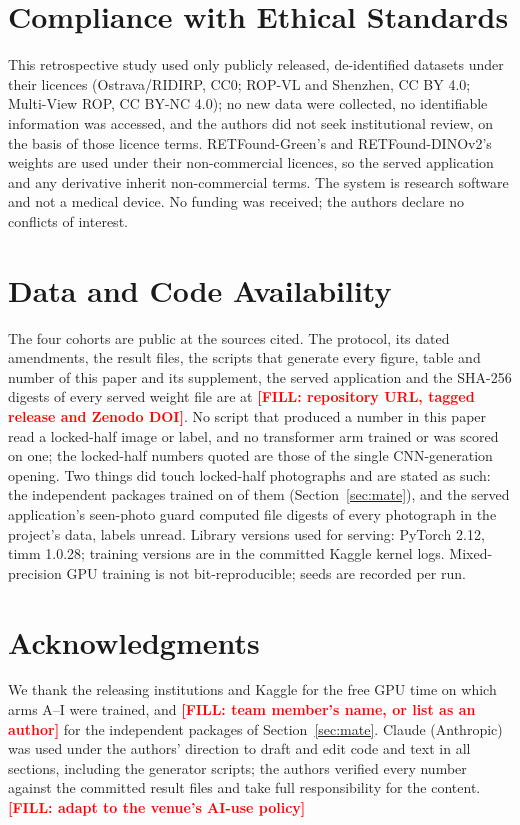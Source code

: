 \documentclass[journal]{IEEEtran}
\newcommand{\FILL}[1]{\textcolor{red}{\textbf{[FILL: #1]}}}
\begin{document}
\section*{Compliance with Ethical Standards}
This retrospective study used only publicly released, de-identified datasets under their licences (Ostrava/RIDIRP, CC0; ROP-VL and Shenzhen, CC BY 4.0; Multi-View ROP, CC BY-NC 4.0); no new data were collected, no identifiable information was accessed, and the authors did not seek institutional review, on the basis of those licence terms. RETFound-Green's and RETFound-DINOv2's weights are used under their non-commercial licences, so the served application and any derivative inherit non-commercial terms. The system is research software and not a medical device. No funding was received; the authors declare no conflicts of interest.

\section*{Data and Code Availability}
The four cohorts are public at the sources cited. The protocol, its dated amendments, the result files, the scripts that generate every figure, table and number of this paper and its supplement, the served application and the SHA-256 digests of every served weight file are at \FILL{repository URL, tagged release and Zenodo DOI}. No script that produced a number in this paper read a locked-half image or label, and no transformer arm trained or was scored on one; the locked-half numbers quoted are those of the single CNN-generation opening. Two things did touch locked-half photographs and are stated as such: the independent packages trained on \mateLockedTrain{} of them (Section~\ref{sec:mate}), and the served application's seen-photo guard computed file digests of every photograph in the project's data, labels unread. Library versions used for serving: PyTorch 2.12, timm 1.0.28; training versions are in the committed Kaggle kernel logs. Mixed-precision GPU training is not bit-reproducible; seeds are recorded per run.

\section*{Acknowledgments}
We thank the releasing institutions and Kaggle for the free GPU time on which arms A--I were trained, and \FILL{team member's name, or list as an author} for the independent packages of Section~\ref{sec:mate}. Claude (Anthropic) was used under the authors' direction to draft and edit code and text in all sections, including the generator scripts; the authors verified every number against the committed result files and take full responsibility for the content. \FILL{adapt to the venue's AI-use policy}
\end{document}
